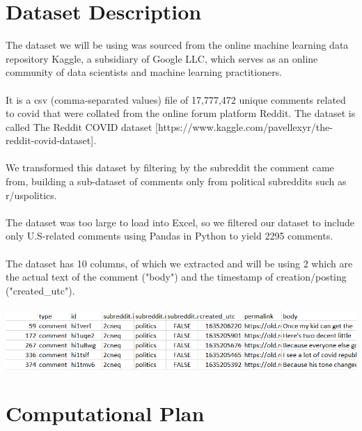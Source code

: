 \documentclass[fontsize=11pt]{article}
\begin{document}
\section*{Dataset Description}

The dataset we will be using was sourced from the online machine learning data repository Kaggle, a subsidiary of Google LLC, which serves as an online community of data scientists and machine learning practitioners.
\\\\
It is a csv (comma-separated values) file of 17,777,472 unique comments related to covid that were collated from the online forum platform Reddit. The dataset is called The Reddit COVID dataset [https://www.kaggle.com/pavellexyr/the-reddit-covid-dataset].
\\\\
We transformed this dataset by filtering by the subreddit the comment came from, building a sub-dataset of comments only from political subreddits such as r/uspolitics.
\\\\
The dataset was too large to load into Excel, so we filtered our dataset to include only U.S-related comments using Pandas in Python to yield 2295 comments.
\\\\
The dataset has 10 columns, of which we extracted and will be using 2 which are the actual text of the comment ("body") and the timestamp of creation/posting ("created\_utc"). \\\\
\includegraphics{rows.png}

\section*{Computational Plan}
\end{document}
